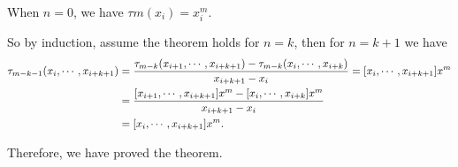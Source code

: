 \documentclass[a4paper]{article}
\begin{document}
When $n=0$, we have $\tau{m}(x_i) = x_i^m$. 

So by induction, assume the theorem holds for $n=k$, then for $n=k+1$ we have
\begin{equation}
    \begin{aligned}
        \tau_{m-k-1} \qty(x_i,\cdots,x_{i+k+1}) &= \frac{\tau_{m-k} (x_{i+1},\cdots,x_{i+k+1}) - \tau_{m-k}(x_{i}, \cdots, x_{i+k})}{x_{i+k+1} - x_i} = [x_i,\cdots,x_{i+k+1}]x^m \\
        &= \frac{[x_{i+1},\cdots, x_{i+k+1}]x^m - [x_{i}, \cdots, x_{i+k}]x^m}{x_{i+k+1} - x_i} \\
        &= [x_i,\cdots,x_{i+k+1}]x^m.
    \end{aligned}
\end{equation}

Therefore, we have proved the theorem.
\end{document}
